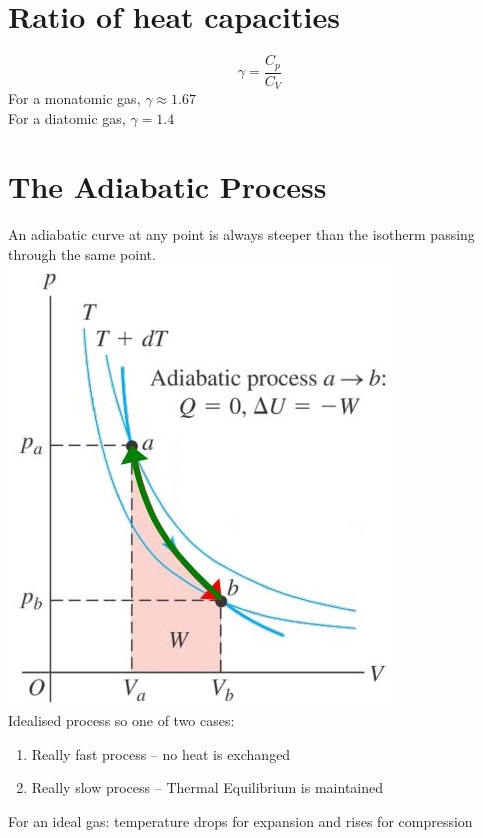 \documentclass[a4paper, 11pt, fleqn, normalem]{report}
\begin{document}
\section{Ratio of heat capacities}
\vspace{-22pt}
\begin{equation*}
	\gamma = \frac{C_{p}}{C_{V}}
\end{equation*}
For a monatomic gas, $\gamma \approx 1.67$ \\
For a diatomic gas, $\gamma = 1.4$

\section{The Adiabatic Process}
An adiabatic curve at any point is always steeper than the isotherm passing through the same point. \\
\includegraphics[scale=0.7]{Adiabatic.jpg} \\
Idealised process so one of two cases:
\begin{enumerate}
	\item Really fast process -- no heat is exchanged
	\item Really slow process -- Thermal Equilibrium is maintained
\end{enumerate}
For an ideal gas: temperature drops for expansion and rises for compression
\end{document}
